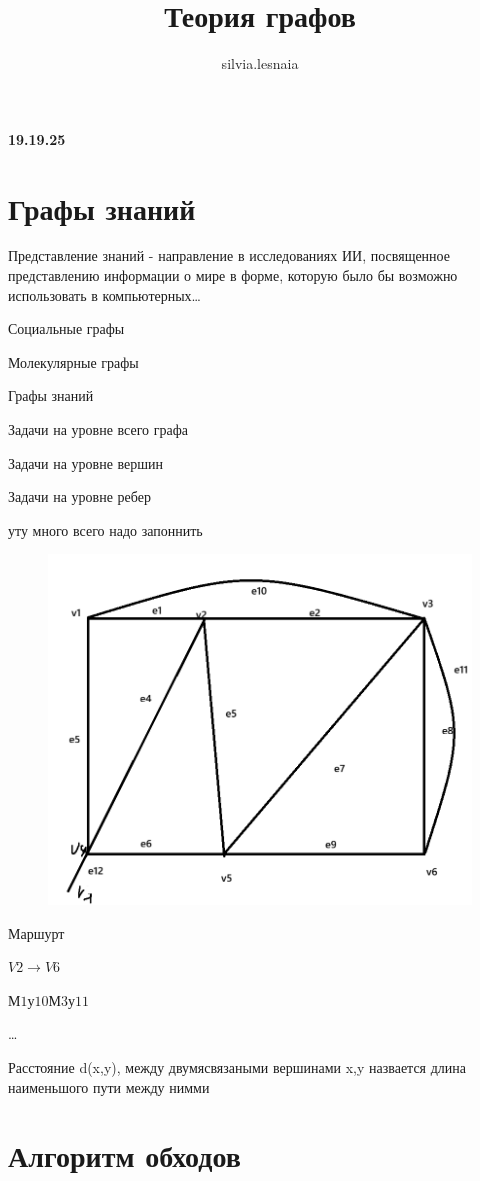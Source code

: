 \documentclass{article}
\title{Теория графов}
\author{silvia.lesnaia }
\begin{document}
\maketitle

\textbf{19.19.25}

\section{Графы знаний}

Представление знаний - направление в исследованиях ИИ, посвященное
представлению информации о мире в форме, которую было бы возможно
использовать в компьютерных\dots

Социальные графы 

Молекулярные графы 

Графы знаний


Задачи на уровне  всего графа


Задачи на уровне вершин


Задачи на уровне ребер




уту много всего  надо запоннить 

\begin{figure} [H]
    \includegraphics[width=0.50\linewidth]{Без имени.png}
\end{figure}

Маршурт

$V2\rightarrow V6$

$М1у10М3у11$





\dots




Расстояние d(x,y), между двумясвязаными вершинами x,y назвается длина наименьшого пути между нимми



\section{Алгоритм обходов}
\end{document}

